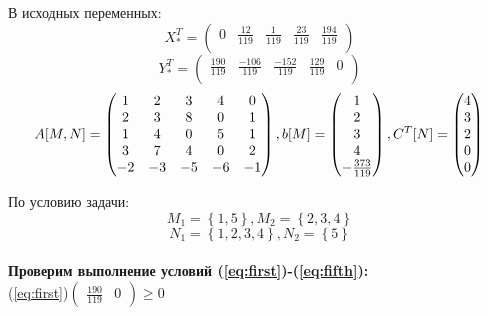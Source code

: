 \documentclass[../body.tex]{subfiles}
\begin{document}
	В исходных переменных:\\ 
	$$X^T_{*} =  \begin{pmatrix}	0 & \frac{12}{119} & \frac{1}{119} & \frac{23}{119} & \frac{194}{119} \\ \end{pmatrix}$$
	\setcounter{MaxMatrixCols}{20}
	$$Y^T_{*} =  \begin{pmatrix}		\frac{190}{119} & \frac{-106}{119} & \frac{-152}{119} & \frac{129}{119}  & 0\\ \end{pmatrix}$$
	\vspace{\baselineskip}
	$$ A[M,N] = 	\begin{pmatrix} 
		1 & 2 & 3 & 4 & 0 \\
		2 & 3 & 8 & 0 & 1 \\
		1 & 4 & 0 & 5 & 1 \\
		3 & 7 & 4 & 0 & 2 \\
		-2 & -3 & -5 & -6 & -1 \\
	\end{pmatrix}, 
	b[M]=\begin{pmatrix}
	1\\2\\3\\4\\
	-\frac{373}{119}
	\end{pmatrix}, 
	C^T[N]=
	\begin{pmatrix}
	4\\3\\2\\0\\0
	\end{pmatrix}\\$$ 
	\vspace{\baselineskip}
	
	По условию задачи:\\
	$$M_1=\left\lbrace 1,5\right\rbrace , M_2=\left\lbrace 2,3,4\right\rbrace $$
	$$N_1=\left\lbrace 1,2,3,4\right\rbrace , N_2=\left\lbrace 5\right\rbrace $$\\
	\vspace{\baselineskip}
	\textbf{Проверим выполнение условий (\ref{eq:first})-(\ref{eq:fifth}):}\\
	(\ref{eq:first})$
	\begin{pmatrix}
	\frac{190}{119} & 0
	\end{pmatrix}  \ge 0 $ 
	\checkmark \\
	\vspace{\baselineskip}
	
\end{document}
